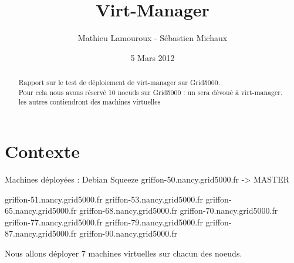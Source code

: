 \documentclass{article}
\begin{document}
\title{Virt-Manager}
\author{Mathieu Lamouroux - Sébastien Michaux}
\date{5 Mars 2012}
\maketitle

\begin{abstract}
Rapport sur le test de déploiement de virt-manager sur Grid5000.\\
Pour cela nous avons réservé 10 noeuds sur Grid5000 : un sera dévoué à virt-manager, les autres contiendront des machines virtuelles
\end{abstract}
\section{Contexte}
Machines déployées : Debian Squeeze
griffon-50.nancy.grid5000.fr -> MASTER

griffon-51.nancy.grid5000.fr
griffon-53.nancy.grid5000.fr
griffon-65.nancy.grid5000.fr
griffon-68.nancy.grid5000.fr
griffon-70.nancy.grid5000.fr
griffon-77.nancy.grid5000.fr
griffon-79.nancy.grid5000.fr
griffon-87.nancy.grid5000.fr
griffon-90.nancy.grid5000.fr

Nous allons déployer 7 machines virtuelles sur chacun des noeuds.
\end{document}
